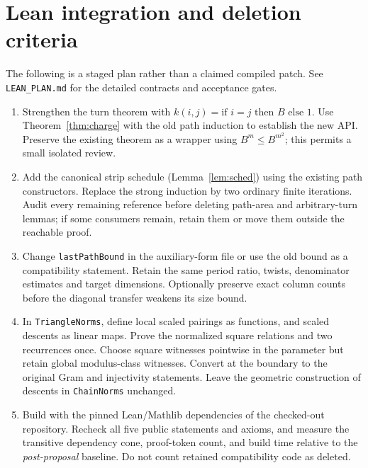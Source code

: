 \documentclass[11pt]{article}
\newcommand{\code}[1]{\texttt{#1}}
\begin{document}
\section{Lean integration and deletion criteria}
The following is a staged plan rather than a claimed compiled patch. See \code{LEAN\_PLAN.md} for the detailed contracts and acceptance gates.
\begin{enumerate}
\item Strengthen the turn theorem with $k(i,j)=\text{if }i=j\text{ then }B\text{ else }1$. Use Theorem~\ref{thm:charge} with the old path induction to establish the new API. Preserve the existing theorem as a wrapper using $B^m\le B^{m^2}$; this permits a small isolated review.
\item Add the canonical strip schedule (Lemma~\ref{lem:sched}) using the existing path constructors. Replace the strong induction by two ordinary finite iterations. Audit every remaining reference before deleting path-area and arbitrary-turn lemmas; if some consumers remain, retain them or move them outside the reachable proof.
\item Change \code{lastPathBound} in the auxiliary-form file or use the old bound as a compatibility statement. Retain the same period ratio, twists, denominator estimates and target dimensions. Optionally preserve exact column counts before the diagonal transfer weakens its size bound.
\item In \code{TriangleNorms}, define local scaled pairings as functions, and scaled descents as linear maps. Prove the normalized square relations and two recurrences once. Choose square witnesses pointwise in the parameter but retain global modulus-class witnesses. Convert at the boundary to the original Gram and injectivity statements. Leave the geometric construction of descents in \code{ChainNorms} unchanged.
\item Build with the pinned Lean/Mathlib dependencies of the checked-out repository. Recheck all five public statements and axioms, and measure the transitive dependency cone, proof-token count, and build time relative to the \emph{post-proposal} baseline. Do not count retained compatibility code as deleted.
\end{enumerate}
\end{document}
